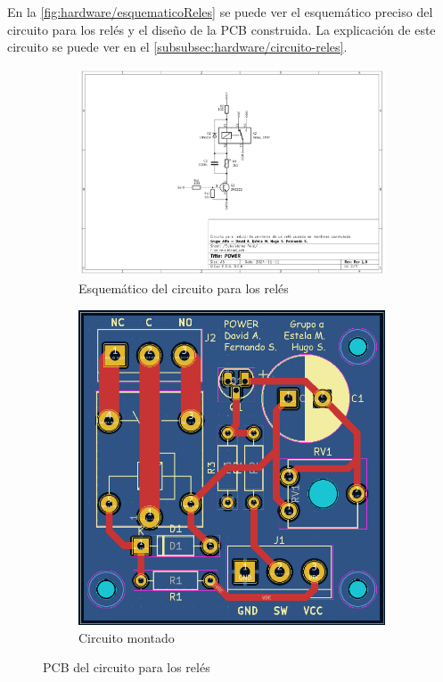 En la \autoref{fig:hardware/esquematicoReles} se puede ver el esquemático preciso del circuito para los relés y el diseño de la PCB construida. La explicación de este circuito se puede ver en el \autoref{subsubsec:hardware/circuito-reles}.

\begin{figure}[H]
    \centering
    \begin{subfigure}[b]{0.65\textwidth}
        \includegraphics[width=\textwidth]{images/2-hardware/esquematicoReles.png}
        \caption{Esquemático del circuito para los relés}
    \end{subfigure}
    \hfill
    \begin{subfigure}[b]{0.3\textwidth}
        \includegraphics[width=\textwidth]{images/2-hardware/pcbReles.png}
        \caption{Circuito montado}
    \end{subfigure}
    \caption{PCB del circuito para los relés}
    \label{fig:hardware/esquematicoReles}
\end{figure}